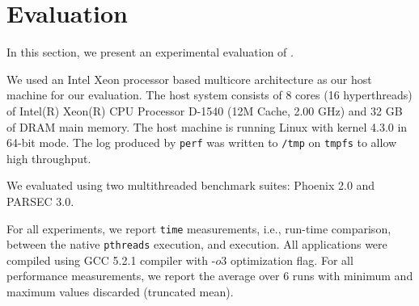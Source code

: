 \section{Evaluation}
\label{sec:evaluation}
In this section, we present an experimental evaluation of \projecttitle.%
%





 We used an Intel Xeon processor based
multicore architecture as our host machine for our evaluation. The
host system consists of 8 cores (16 hyperthreads) of Intel(R) Xeon(R) CPU Processor D-1540
(12M Cache, 2.00 GHz) and 32 GB of DRAM main memory. The host
machine is running Linux with kernel 4.3.0 in 64-bit mode. The log produced by
{\tt perf} was written to {\tt /tmp} on {\tt tmpfs} to allow high throughput.


  We evaluated \projecttitle using two multithreaded benchmark suites: Phoenix 2.0 and PARSEC 3.0. 

%

  For all experiments,  we report {\tt time}
measurements, i.e., run-time comparison, between the native {\tt pthreads}
execution, and \projecttitle execution.  All applications were compiled using
GCC 5.2.1 compiler with -$o3$ optimization flag. For all performance
measurements, we report the average over 6 runs with minimum and maximum values
discarded (truncated mean).

